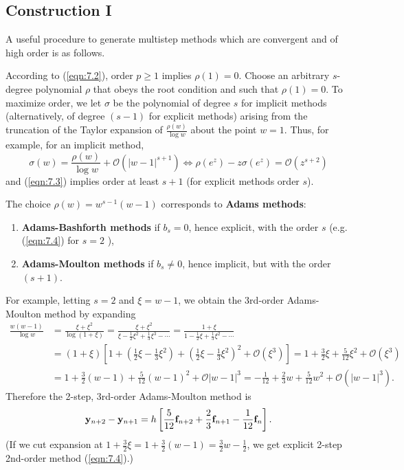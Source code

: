 \documentclass[a4paper]{article}
\begin{document}
\subsection{Construction I}
A useful procedure to generate multistep methods which are convergent and of high order is as follows.
\begin{technique}\label{tech:7.10}
    According to (\ref{eqn:7.2}), order $p \geq 1$ implies $\rho(1)=0$. Choose an arbitrary $s$-degree polynomial $\rho$ that obeys the root condition and such that $\rho(1)=0$. To maximize order, we let $\sigma$ be the polynomial of degree $s$ for implicit methods (alternatively, of degree $(s-1)$ for explicit methods) arising from the truncation of the Taylor expansion of $\frac{\rho(w)}{\log w}$ about the point $w=1$. Thus, for example, for an implicit method,
    \[
    \sigma(w)=\frac{\rho(w)}{\log w}+\mathcal{O}\left(|w-1|^{s+1}\right) \Leftrightarrow \rho\left(e^z\right)-z \sigma\left(e^z\right)=\mathcal{O}\left(z^{s+2}\right)
    \]
    and (\ref{eqn:7.3}) implies order at least $s+1$ (for explicit methods order $s$).
\end{technique}
\begin{example}\label{eg:7.11}
    The choice $\rho(w)=w^{s-1}(w-1)$ corresponds to \textbf{Adams methods}:
\begin{enumerate}[(1)]
    \item \textbf{Adams-Bashforth methods} if $b_s=0$, hence explicit, with the order $s$ (e.g. (\ref{eqn:7.4}) for $s=2$ ),
    \item \textbf{Adams-Moulton methods} if $b_s \neq 0$, hence implicit, but with the order $(s+1)$.
\end{enumerate}
For example, letting $s=2$ and $\xi=w-1$, we obtain the 3rd-order Adams-Moulton method by expanding
\[
\begin{aligned}
\frac{w(w-1)}{\log w} & =\frac{\xi+\xi^2}{\log (1+\xi)}=\frac{\xi+\xi^2}{\xi-\frac{1}{2} \xi^2+\frac{1}{3} \xi^3-\cdots}=\frac{1+\xi}{1-\frac{1}{2} \xi+\frac{1}{3} \xi^2-\cdots} \\
& =(1+\xi)\left[1+\left(\frac{1}{2} \xi-\frac{1}{3} \xi^2\right)+\left(\frac{1}{2} \xi-\frac{1}{3} \xi^2\right)^2+\mathcal{O}\left(\xi^3\right)\right]=1+\frac{3}{2} \xi+\frac{5}{12} \xi^2+\mathcal{O}\left(\xi^3\right) \\
& =1+\frac{3}{2}(w-1)+\frac{5}{12}(w-1)^2+\mathcal{O}|w-1|^3=-\frac{1}{12}+\frac{2}{3} w+\frac{5}{12} w^2+\mathcal{O}\left(|w-1|^3\right) .
\end{aligned}
\]
Therefore the 2-step, 3rd-order Adams-Moulton method is
\[
\mathbf{y}_{n+2}-\mathbf{y}_{n+1}=h\left[\frac{5}{12} \mathbf{f}_{n+2}+\frac{2}{3} \mathbf{f}_{n+1}-\frac{1}{12} {\bf f}_n\right] .
\]
(If we cut expansion at $1+\frac{3}{2} \xi=1+\frac{3}{2}(w-1)=\frac{3}{2} w-\frac{1}{2}$, we get explicit 2-step 2nd-order method (\ref{eqn:7.4}).)
\end{example}
\end{document}

